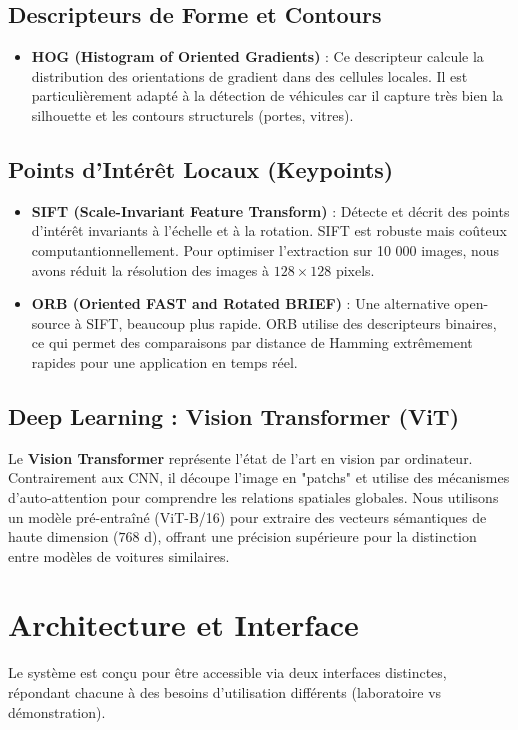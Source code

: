 \documentclass[a4paper,12pt]{report}%
\begin{document}
\section{Descripteurs de Forme et Contours}
\begin{itemize}
    \item \textbf{HOG (Histogram of Oriented Gradients)} : Ce descripteur calcule la distribution des orientations de gradient dans des cellules locales. Il est particulièrement adapté à la détection de véhicules car il capture très bien la silhouette et les contours structurels (portes, vitres).
\end{itemize}

\section{Points d'Intérêt Locaux (Keypoints)}
\begin{itemize}
    \item \textbf{SIFT (Scale-Invariant Feature Transform)} : Détecte et décrit des points d'intérêt invariants à l'échelle et à la rotation. SIFT est robuste mais coûteux computantionnellement. Pour optimiser l'extraction sur 10 000 images, nous avons réduit la résolution des images à $128 \times 128$ pixels.
    \item \textbf{ORB (Oriented FAST and Rotated BRIEF)} : Une alternative open-source à SIFT, beaucoup plus rapide. ORB utilise des descripteurs binaires, ce qui permet des comparaisons par distance de Hamming extrêmement rapides pour une application en temps réel.
\end{itemize}

\section{Deep Learning : Vision Transformer (ViT)}
Le \textbf{Vision Transformer} représente l'état de l'art en vision par ordinateur. Contrairement aux CNN, il découpe l'image en "patchs" et utilise des mécanismes d'auto-attention pour comprendre les relations spatiales globales. Nous utilisons un modèle pré-entraîné (ViT-B/16) pour extraire des vecteurs sémantiques de haute dimension ($768$ d), offrant une précision supérieure pour la distinction entre modèles de voitures similaires.

\chapter{Architecture et Interface}
Le système est conçu pour être accessible via deux interfaces distinctes, répondant chacune à des besoins d'utilisation différents (laboratoire vs démonstration).
\end{document}
